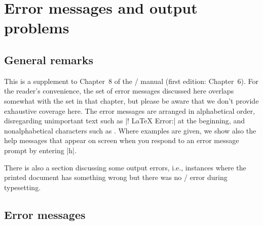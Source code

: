 \documentclass[leqno,titlepage,openany]{amsldoc}
\begin{document}
\chapter{Error messages and output problems}

\section{General remarks}

This is a supplement to Chapter~8 of the \latex/ manual \cite{lm} (first
edition: Chapter~6). For the reader's convenience, the set of error
messages discussed here overlaps somewhat with the set in that chapter,
but please be aware that we don't provide exhaustive coverage here.
The error messages are arranged in alphabetical order, disregarding
unimportant text such as |! LaTeX Error:| at the beginning, and
nonalphabetical characters such as \qc{\\}. Where examples are given, we
show also the help messages that appear on screen when you respond to an
error message prompt by entering |h|.

There is also a section discussing some output errors, i.e., instances
where the printed document has something wrong but there was no \latex/
error during typesetting.

\section{Error messages}

\end{document}
